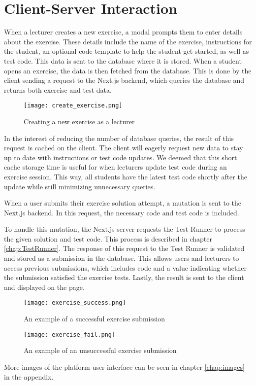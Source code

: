 \section{Client-Server Interaction}
When a lecturer creates a new exercise, a modal prompts them to enter details about the exercise.
These details include the name of the exercise, instructions for the student, an optional code template to help the student get started, as well as test code.
This data is sent to the database where it is stored.
When a student opens an exercise, the data is then fetched from the database.
This is done by the client sending a request to the Next.js backend, which queries the database and returns both exercise and test data.

\begin{figure}[H]
    \centering
    \texttt{[image: create\_exercise.png]}
    \caption{Creating a new exercise as a lecturer}
    \label{fig:create_exercise}
\end{figure}

In the interest of reducing the number of database queries, the result of this request is cached on the client.
The client will eagerly request new data to stay up to date with instructions or test code updates.
We deemed that this short cache storage time is useful for when lecturers update test code during an exercise session.
This way, all students have the latest test code shortly after the update while still minimizing unnecessary queries.

When a user submits their exercise solution attempt, a mutation is sent to the Next.js backend.
In this request, the necessary code and test code is included.

To handle this mutation, the Next.js server requests the Test Runner to process the given solution and test code.
This process is described in chapter \ref{chap:TestRunner}.
The response of this request to the Test Runner is validated and stored as a submission in the database.
This allows users and lecturers to access previous submissions, which includes code and a value indicating whether the submission satisfied the exercise tests.
Lastly, the result is sent to the client and displayed on the page.

\begin{figure}[H]
	\texttt{[image: exercise\_success.png]}
	\centering
	\caption{An example of a successful exercise submission}
	\label{fig:exercise_success}
\end{figure}

\begin{figure}[H]
	\texttt{[image: exercise\_fail.png]}
	\centering
	\caption{An example of an unsuccessful exercise submission}
	\label{fig:exercise_fail}
\end{figure}

More images of the platform user interface can be seen in chapter \ref{chap:images} in the appendix.
